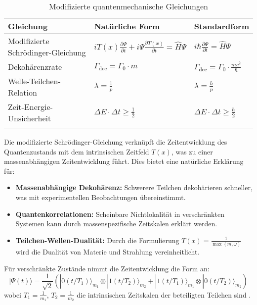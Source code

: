 \documentclass[12pt,a4paper]{article}
\newcommand{\Tfield}{T(x)}
\begin{document}
	\begin{table}[ht]
		\centering
		\begin{adjustbox}{scale=1.1}
			\begin{tabular}{lll}
				\hline
				\textbf{Gleichung} & \textbf{Natürliche Form} & \textbf{Standardform} \\
				\hline
				Modifizierte Schrödinger-Gleichung & $i\Tfield\frac{\partial\Psi}{\partial t} + i\Psi\frac{\partial \Tfield}{\partial t} = \hat{H}\Psi$ & $i\hbar\frac{\partial\Psi}{\partial t} = \hat{H}\Psi$ \\
				Dekohärenzrate & $\Gamma_{\text{dec}} = \Gamma_0 \cdot m$ & $\Gamma_{\text{dec}} = \Gamma_0 \cdot \frac{mc^2}{\hbar}$ \\
				Welle-Teilchen-Relation & $\lambda = \frac{1}{p}$ & $\lambda = \frac{h}{p}$ \\
				Zeit-Energie-Unsicherheit & $\Delta E \cdot \Delta t \geq \frac{1}{2}$ & $\Delta E \cdot \Delta t \geq \frac{\hbar}{2}$ \\
				\hline
				\multicolumn{2}{c}{} \\
				\hline
			\end{tabular}
		\end{adjustbox}
		\caption{Modifizierte quantenmechanische Gleichungen}
		\label{tab:qm_equations}
	\end{table}
	

	
	Die modifizierte Schrödinger-Gleichung verknüpft die Zeitentwicklung des Quantenzustands mit dem intrinsischen Zeitfeld $\Tfield$, was zu einer massenabhängigen Zeitentwicklung führt. Dies bietet eine natürliche Erklärung für:
	
	\begin{itemize}
		\item \textbf{Massenabhängige Dekohärenz:} Schwerere Teilchen dekohärieren schneller, was mit experimentellen Beobachtungen übereinstimmt.
		\item \textbf{Quantenkorrelationen:} Scheinbare Nichtlokalität in verschränkten Systemen kann durch massenspezifische Zeitskalen erklärt werden.
		\item \textbf{Teilchen-Wellen-Dualität:} Durch die Formulierung $\Tfield = \frac{1}{\max(m,\omega)}$ wird die Dualität von Materie und Strahlung vereinheitlicht.
	\end{itemize}
	
	Für verschränkte Zustände nimmt die Zeitentwicklung die Form an:
	\begin{equation}
		|\Psi(t)\rangle = \frac{1}{\sqrt{2}}\left(|0(t/T_1)\rangle_{m_1} \otimes |1(t/T_2)\rangle_{m_2} + |1(t/T_1)\rangle_{m_1} \otimes |0(t/T_2)\rangle_{m_2}\right)
	\end{equation}
	wobei $T_1 = \frac{1}{m_1}$, $T_2 = \frac{1}{m_2}$ die intrinsischen Zeitskalen der beteiligten Teilchen sind \cite{pascher_quantum_2025, pascher_photons_2025}.
	
\end{document}
